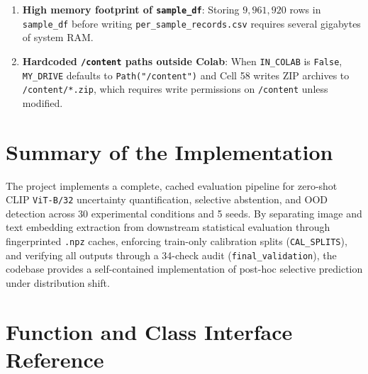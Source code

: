 \documentclass[11pt,a4paper]{article}
\begin{document}
\begin{enumerate}
  \item \textbf{High memory footprint of \texttt{sample\_\allowbreak{}df}}: Storing $9,961,920$ rows in \texttt{sample\_\allowbreak{}df} before writing \texttt{per\_\allowbreak{}sample\_\allowbreak{}records.\allowbreak{}csv} requires several gigabytes of system RAM.
  \item \textbf{Hardcoded \texttt{/\allowbreak{}content} paths outside Colab}: When \texttt{IN\_\allowbreak{}COLAB} is \texttt{False}, \texttt{MY\_\allowbreak{}DRIVE} defaults to \texttt{Path(\allowbreak{}"/\allowbreak{}content")} and Cell 58 writes ZIP archives to \texttt{/\allowbreak{}content/\allowbreak{}*.\allowbreak{}zip}, which requires write permissions on \texttt{/\allowbreak{}content} unless modified.
\end{enumerate}

\section{Summary of the Implementation}

The project implements a complete, cached evaluation pipeline for zero-shot CLIP \texttt{ViT-B/\allowbreak{}32} uncertainty quantification, selective abstention, and OOD detection across 30 experimental conditions and 5 seeds. By separating image and text embedding extraction from downstream statistical evaluation through fingerprinted \texttt{.\allowbreak{}npz} caches, enforcing train-only calibration splits (\texttt{CAL\_\allowbreak{}SPLITS}), and verifying all outputs through a 34-check audit (\texttt{final\_\allowbreak{}validation}), the codebase provides a self-contained implementation of post-hoc selective prediction under distribution shift.

\appendix

\section{Function and Class Interface Reference}
\end{document}
